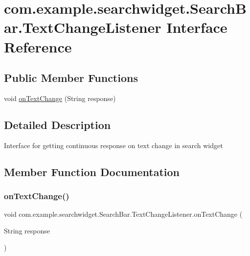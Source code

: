 \hypertarget{interfacecom_1_1example_1_1searchwidget_1_1_search_bar_1_1_text_change_listener}{}\section{com.\+example.\+searchwidget.\+Search\+Bar.\+Text\+Change\+Listener Interface Reference}
\label{interfacecom_1_1example_1_1searchwidget_1_1_search_bar_1_1_text_change_listener}
\subsection*{Public Member Functions}
\begin{DoxyCompactItemize}
\item 
void \mbox{\hyperlink{interfacecom_1_1example_1_1searchwidget_1_1_search_bar_1_1_text_change_listener_a805aa2c8e3d67db651fac86758ba448e}{on\+Text\+Change}} (String response)
\end{DoxyCompactItemize}


\subsection{Detailed Description}
Interface for getting continuous response on text change in search widget 

\subsection{Member Function Documentation}
\mbox{\label{interfacecom_1_1example_1_1searchwidget_1_1_search_bar_1_1_text_change_listener_a805aa2c8e3d67db651fac86758ba448e}} 
\subsubsection{\texorpdfstring{onTextChange()}{onTextChange()}}
{\footnotesize\ttfamily void com.\+example.\+searchwidget.\+Search\+Bar.\+Text\+Change\+Listener.\+on\+Text\+Change (\begin{DoxyParamCaption}\item[{String}]{response }\end{DoxyParamCaption})}

